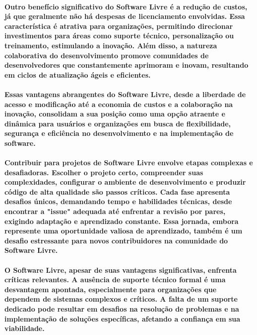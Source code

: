 \documentclass[a4paper, 12pt]{article}
\begin{document}
\paragraph{Outro benefício significativo do Software Livre é a redução de custos, já que geralmente não há despesas de licenciamento envolvidas. Essa característica é atrativa para organizações, permitindo direcionar investimentos para áreas como suporte técnico, personalização ou treinamento, estimulando a inovação. Além disso, a natureza colaborativa do desenvolvimento promove comunidades de desenvolvedores que constantemente aprimoram e inovam, resultando em ciclos de atualização ágeis e eficientes.}
\paragraph{Essas vantagens abrangentes do Software Livre, desde a liberdade de acesso e modificação até a economia de custos e a colaboração na inovação, consolidam a sua posição como uma opção atraente e dinâmica para usuários e organizações em busca de flexibilidade, segurança e eficiência no desenvolvimento e na implementação de software.}

\paragraph{Contribuir para projetos de Software Livre envolve etapas complexas e desafiadoras. Escolher o projeto certo, compreender suas complexidades, configurar o ambiente de desenvolvimento e produzir código de alta qualidade são passos críticos. Cada fase apresenta desafios únicos, demandando tempo e habilidades técnicas, desde encontrar a "issue" adequada até enfrentar a revisão por pares, exigindo adaptação e aprendizado constante. Essa jornada, embora represente uma oportunidade valiosa de aprendizado, também é um desafio estressante para novos contribuidores na comunidade do Software Livre.}

\paragraph{O Software Livre, apesar de suas vantagens significativas, enfrenta críticas relevantes. A ausência de suporte técnico formal é uma desvantagem apontada, especialmente para organizações que dependem de sistemas complexos e críticos. A falta de um suporte dedicado pode resultar em desafios na resolução de problemas e na implementação de soluções específicas, afetando a confiança em sua viabilidade.}
\end{document}
